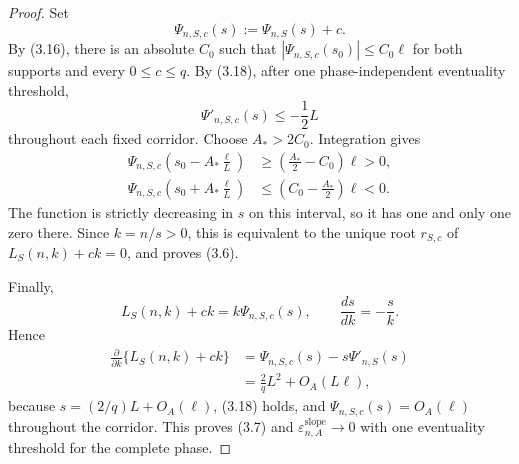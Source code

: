 \begin{proof}
Set
\[
  \Psi_{n,S,c}(s):=\Psi_{n,S}(s)+c.
\]
By (3.16), there is an absolute $C_0$ such that
$|\Psi_{n,S,c}(s_0)|\le C_0\ell$ for both supports and every
$0\le c\le q$. By (3.18), after one phase-independent eventuality threshold,
\[
  \Psi'_{n,S,c}(s)\le-\frac12L
\]
throughout each fixed corridor. Choose $A_*>2C_0$. Integration gives
\[
\begin{aligned}
  \Psi_{n,S,c}\!\left(s_0-A_*\frac\ell L\right)
  &\ge\left(\frac{A_*}{2}-C_0\right)\ell>0,\\
  \Psi_{n,S,c}\!\left(s_0+A_*\frac\ell L\right)
  &\le\left(C_0-\frac{A_*}{2}\right)\ell<0.
\end{aligned}
\]
The function is strictly decreasing in $s$ on this interval, so it has one and
only one zero there. Since $k=n/s>0$, this is equivalent to the unique root
$r_{S,c}$ of $L_S(n,k)+ck=0$, and proves (3.6).

Finally,
\[
  L_S(n,k)+ck=k\Psi_{n,S,c}(s),
  \qquad
  \frac{ds}{dk}=-\frac sk.
\]
Hence
\begin{equation*}
\begin{split}
  \frac{\partial}{\partial k}\{L_S(n,k)+ck\}
  &=\Psi_{n,S,c}(s)-s\Psi'_{n,S}(s)\\
  &=\frac2qL^2+O_A(L\ell),
\end{split}
  \tag{3.19}
\end{equation*}
because $s=(2/q)L+O_A(\ell)$, (3.18) holds, and
$\Psi_{n,S,c}(s)=O_A(\ell)$ throughout the corridor. This proves (3.7) and
$\varepsilon_{n,A}^{\mathrm{slope}}\to0$ with one eventuality threshold for
the complete phase.
\end{proof}